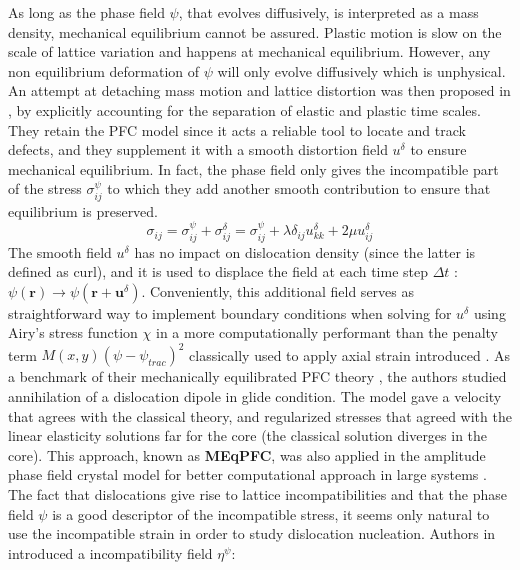 \documentclass[11pt]{article}
\begin{document}
As long as the phase field $\psi$, that evolves diffusively, is interpreted as a mass density, mechanical equilibrium cannot be assured. Plastic motion is slow on the scale of lattice variation and happens at mechanical equilibrium. However, any non equilibrium deformation of $\psi$ will only evolve diffusively which is unphysical. An attempt at detaching mass motion and lattice distortion was then proposed in \parencite{skaugenSeparationElastic2018}, by explicitly accounting for the separation of elastic and plastic time scales. They retain the PFC model since it acts a reliable tool to locate and track defects, and they supplement it with a smooth distortion field $u^\delta$ to ensure mechanical equilibrium. In fact, the phase field only gives the incompatible part of the stress $\sigma^{\psi}_{ij}$ to which they add another smooth contribution to ensure that equilibrium is preserved.
\begin{equation}
    \sigma_{ij} = \sigma^{\psi}_{ij}+\sigma^{\delta}_{ij}=\sigma^{\psi}_{ij}+\lambda \delta_{ij}u_{kk}^\delta+2\mu u_{ij}^\delta 
\end{equation}
The smooth field $u^\delta$ has no impact on dislocation density (since the latter is defined as curl), and it is used to displace the field at each time step $\Delta t$ : $\psi(\bm r) \rightarrow \psi(\bm r + \bm u ^\delta)$. Conveniently, this additional field serves as straightforward way to implement boundary conditions when solving for $u^\delta$ using Airy's stress function $\chi$ in a more computationally performant than the penalty term $M(x,y)(\psi-\psi_{trac})^2$ classically used to apply axial strain introduced \parencite{stefanovicPhasefield2009}. As a benchmark of their mechanically equilibrated PFC theory \parencite{skaugenSeparationElastic2018}, the authors studied annihilation of a dislocation dipole in glide condition. The model gave a velocity that agrees with the classical theory, and regularized stresses that agreed with the linear elasticity solutions far for the core (the classical solution diverges in the core). This approach, known as \textbf{MEqPFC}, was also applied in the amplitude phase field crystal model for better computational approach in large systems \parencite{salvalagliocoarsegrainedphasefield2020}.
The fact that dislocations give rise to lattice incompatibilities and that the phase field $\psi$ is a good descriptor of the incompatible stress, it seems only natural to use the incompatible strain in order to study dislocation nucleation. Authors in \parencite{skogvollDislocationnucleation2021} introduced a incompatibility field $\eta^\psi$:
\end{document}
